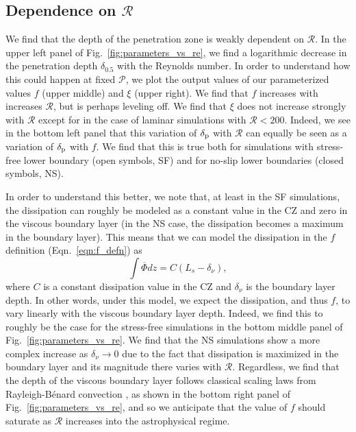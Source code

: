 \documentclass{aastex631}
\newcommand{\delp}{\ensuremath{\delta_{\rm{p}}}}
\newcommand{\mP}{\ensuremath{\mathcal{P}}}
\newcommand{\mR}{\ensuremath{\mathcal{R}}}
\renewcommand{\bar}[1]{\overline{#1}}
\begin{document}
\subsection{Dependence on $\mR$}

We find that the depth of the penetration zone is weakly dependent on $\mR$.
In the upper left panel of Fig.~\ref{fig:parameters_vs_re}, we find a logarithmic decrease in the penetration depth $\delta_{0.5}$ with the Reynolds number.
In order to understand how this could happen at fixed $\mP$, we plot the output values of our parameterized values $f$ (upper middle) and $\xi$ (upper right).
We find that $f$ increases with increases $\mR$, but is perhaps leveling off.
We find that $\xi$ does not increase strongly with $\mR$ except for in the case of laminar simulations with $\mR < 200$.
Indeed, we see in the bottom left panel that this variation of $\delp$ with $\mR$ can equally be seen as a variation of $\delp$ with $f$.
We find that this is true both for simulations with stress-free lower boundary (open symbols, SF) and for no-slip lower boundaries (closed symbols, NS).

In order to understand this better, we note that, at least in the SF simulations, the dissipation can roughly be modeled as a constant value in the CZ and zero in the viscous boundary layer (in the NS case, the dissipation becomes a maximum in the boundary layer).
This means that we can model the dissipation in the $f$ definition (Eqn.~\ref{eqn:f_defn}) as
\begin{equation}
\int \bar{\Phi} dz = C ( L_s - \delta_\nu ),
\end{equation}
where $C$ is a constant dissipation value in the CZ and $\delta_\nu$ is the boundary layer depth.
In other words, under this model, we expect the dissipation, and thus $f$, to vary linearly with the viscous boundary layer depth.
Indeed, we find this to roughly be the case for the stress-free simulations in the bottom middle panel of Fig.~\ref{fig:parameters_vs_re}.
We find that the NS simulations show a more complex increase as $\delta_\nu \rightarrow 0$ due to the fact that dissipation is maximized in the boundary layer and its magnitude there varies with $\mR$.
Regardless, we find that the depth of the viscous boundary layer follows classical scaling laws from Rayleigh-B\'{e}nard convection \citep{ahlers_etal_2009, goluskin2016}, as shown in the bottom right panel of Fig.~\ref{fig:parameters_vs_re}, and so we anticipate that the value of $f$ should saturate as $\mR$ increases into the astrophysical regime.
\end{document}
